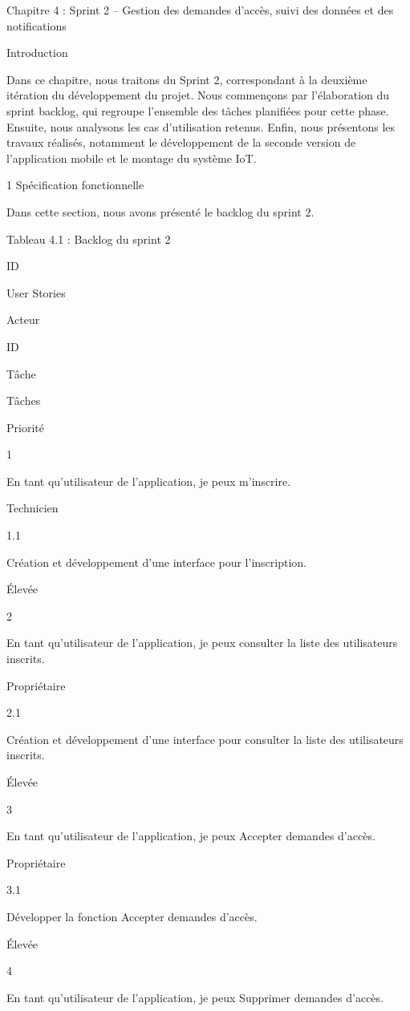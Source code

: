 \documentclass{article}
\begin{document}
Chapitre 4 : Sprint 2 – Gestion des demandes d’accès, suivi des données et des notifications

Introduction 

Dans ce chapitre, nous traitons du Sprint 2, correspondant à la deuxième itération du développement du projet. Nous commençons par l’élaboration du sprint backlog, qui regroupe l’ensemble des tâches planifiées pour cette phase. Ensuite, nous analysons les cas d’utilisation retenus. Enfin, nous présentons les travaux réalisés, notamment le développement de la seconde version de l’application mobile et le montage du système IoT.

1 Spécification fonctionnelle

Dans cette section, nous avons  présenté le backlog du sprint 2.

Tableau 4.1 : Backlog du sprint 2

ID

User Stories

Acteur

ID

Tâche

Tâches

Priorité

1

En tant qu’utilisateur de l’application, je peux m’inscrire.

Technicien

1.1

Création et développement d’une interface pour l’inscription.

Élevée

2

En tant qu’utilisateur de l’application, je peux consulter la liste des utilisateurs inscrits.

Propriétaire

2.1

Création et développement d’une interface pour consulter la liste des utilisateurs inscrits.

Élevée

3

En tant qu’utilisateur de l’application, je peux Accepter demandes d’accès.

Propriétaire

3.1

Développer la fonction Accepter demandes d’accès.

Élevée

4

En tant qu’utilisateur de l’application, je peux Supprimer demandes d’accès.
\end{document}
